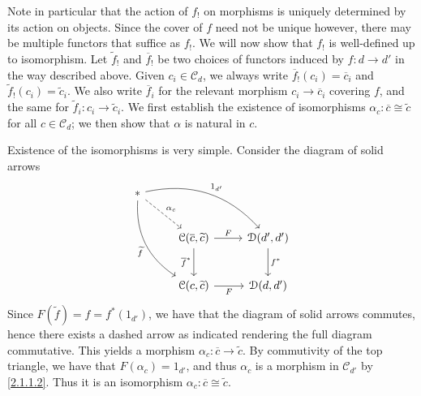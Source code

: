 Note in particular that the action of $f_!$ on morphisms is uniquely determined by its action on objects. Since the cover of $f$ need not be unique however, there may be multiple functors that suffice as $f_!$. We will now show that $f_!$ is well-defined up to isomorphism. Let $\widetilde{f} _! $ and $\overline{f} _!$ be two choices of functors induced by $f : d \to d'$ in the way described above. Given $c_i\in \mathcal{C} _d$, we always write $\overline{f} _!(c_i)=\overline{c} _i$ and $\widetilde{f} _!(c_i)=\widetilde{c} _i$. We also write $\overline{f} _i$ for the relevant morphism $c_i \to \overline{c} _i$ covering $f$, and the same for $\widetilde{f} _i : c_i \to \widetilde{c} _i$. We first establish the existence of isomorphisms $\alpha _c : \overline{c} \cong \widetilde{c} $ for all $c\in \mathcal{C} _d$; we then show that $\alpha $ is natural in $c$.

Existence of the isomorphisms is very simple. Consider the diagram of solid arrows
\[\begin{tikzcd}[row sep = 2.5em, column sep = 2.5em]
* \ar[" 1_{d'}  ", bend left, drr] \ar[" \widetilde{f} "', bend right, ddr] \ar[" \alpha _c ", dashed, dr]  &  &  \\
 & \mathcal{C} (\overline{c} ,\widetilde{c} )\ar[" F ", r] \ar[" \overline{f}^* "', d]  & \mathcal{D} (d',d')\ar[" f^* ", d]  \\
 & \mathcal{C} (c,\widetilde{c} )\ar[" F "', r]  & \mathcal{D} (d,d')
\end{tikzcd}\]
Since $F(\widetilde{f} )=f=f^*(1_{d'} )$, we have that the diagram of solid arrows commutes, hence there exists a dashed arrow as indicated rendering the full diagram commutative. This yields a morphism $\alpha _c : \overline{c}  \to \widetilde{c} $. By commutivity of the top triangle, we have that $F(\alpha_c)=1_{d'} $, and thus $\alpha _c$ is a morphism in $\mathcal{C} _{d'} $ by \cref{2.1.1.2}. Thus it is an isomorphism $\alpha _c : \overline{c} \cong \widetilde{c} $.

